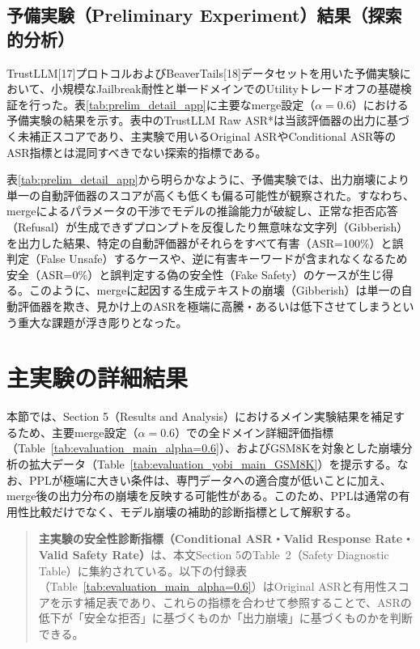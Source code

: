 \documentclass{article}
\begin{document}




\subsection{予備実験（Preliminary Experiment）結果（探索的分析）}
TrustLLM[17]プロトコルおよびBeaverTails[18]データセットを用いた予備実験において、小規模なJailbreak耐性と単一ドメインでのUtilityトレードオフの基礎検証を行った。表\ref{tab:prelim_detail_app}に主要なmerge設定（$\alpha=0.6$）における予備実験の結果を示す。表中のTrustLLM Raw ASR*は当該評価器の出力に基づく未補正スコアであり、主実験で用いるOriginal ASRやConditional ASR等のASR指標とは混同すべきでない探索的指標である。




表\ref{tab:prelim_detail_app}から明らかなように、予備実験では、出力崩壊により単一の自動評価器のスコアが高くも低くも偏る可能性が観察された。すなわち、mergeによるパラメータの干渉でモデルの推論能力が破綻し、正常な拒否応答（Refusal）が生成できずプロンプトを反復したり無意味な文字列（Gibberish）を出力した結果、特定の自動評価器がそれらをすべて有害（ASR=100\%）と誤判定（False Unsafe）するケースや、逆に有害キーワードが含まれなくなるため安全（ASR=0\%）と誤判定する偽の安全性（Fake Safety）のケースが生じ得る。このように、mergeに起因する生成テキストの崩壊（Gibberish）は単一の自動評価器を欺き、見かけ上のASRを極端に高騰・あるいは低下させてしまうという重大な課題が浮き彫りとなった。

\section{主実験の詳細結果}
本節では、Section 5（Results and Analysis）におけるメイン実験結果を補足するため、主要merge設定（$\alpha=0.6$）での全ドメイン詳細評価指標（Table~\ref{tab:evaluation_main_alpha=0.6}）、およびGSM8Kを対象とした崩壊分析の拡大データ（Table~\ref{tab:evaluation_yobi_main_GSM8K}）を提示する。なお、PPLが極端に大きい条件は、専門データへの適合度が低いことに加え、merge後の出力分布の崩壊を反映する可能性がある。このため、PPLは通常の有用性比較だけでなく、モデル崩壊の補助的診断指標として解釈する。

\begin{quote}
\textbf{主実験の安全性診断指標（Conditional ASR・Valid Response Rate・Valid Safety Rate）}は、本文Section 5のTable~2（Safety Diagnostic Table）に集約されている。以下の付録表（Table~\ref{tab:evaluation_main_alpha=0.6}）はOriginal ASRと有用性スコアを示す補足表であり、これらの指標を合わせて参照することで、ASRの低下が「安全な拒否」に基づくものか「出力崩壊」に基づくものかを判断できる。
\end{quote}
\end{document}
